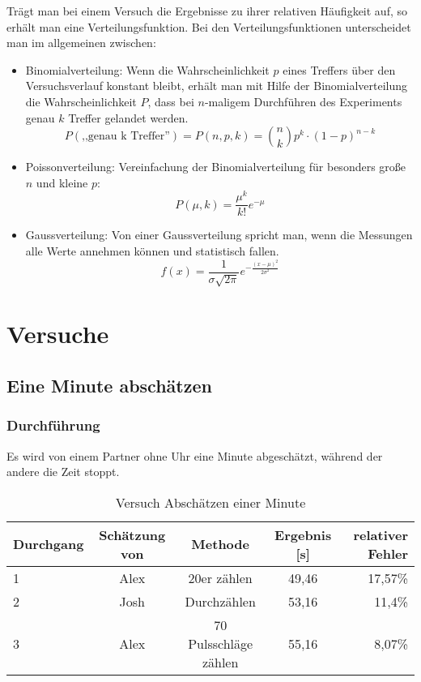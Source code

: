 Trägt man bei einem Versuch die Ergebnisse zu ihrer relativen Häufigkeit auf, so erhält man eine Verteilungsfunktion. Bei den Verteilungsfunktionen unterscheidet man im allgemeinen zwischen:
\begin{itemize}
  \item Binomialverteilung: Wenn die Wahrscheinlichkeit $p$ eines Treffers über den Versuchsverlauf konstant bleibt, erhält man mit Hilfe der Binomialverteilung die Wahrscheinlichkeit $P$, dass bei $n$-maligem Durchführen des Experiments genau $k$ Treffer gelandet werden.
\begin{equation}
  P(\text{,,genau k Treffer''})=P(n,p,k)=\binom{n}{k}p^k\cdot (1-p)^{n-k}
  \label{binomvert}
\end{equation}
  \item Poissonverteilung: Vereinfachung der Binomialverteilung für besonders große $n$ und kleine $p$:
    \begin{equation}
      P(\mu ,k)=\frac{\mu^k}{k!}e^{-\mu}
      \label{poisson}
    \end{equation}
  \item Gaussverteilung: Von einer Gaussverteilung spricht man, wenn die Messungen alle Werte annehmen können und statistisch fallen.
    \begin{equation}
      f(x)=\frac{1}{\sigma\sqrt{2\pi}}e^{-\frac{(x-\mu)^2}{2\sigma^2}}
      \label{gauss}
    \end{equation}
\end{itemize}
\section{Versuche}

\subsection{Eine Minute abschätzen}

\subsubsection{Durchführung}

Es wird von einem Partner ohne Uhr eine Minute abgeschätzt, während der andere die Zeit stoppt. 

\begin{table}[h]
  \centering
  \begin{tabular}{l | c | c | c | r}
    Durchgang & Schätzung von & Methode & Ergebnis [s] & relativer Fehler\\ \hline
    1 & Alex & 20er zählen & 49,46 & 17,57\% \\
    2 & Josh & Durchzählen & 53,16 & 11,4\% \\
    3 & Alex & 70 Pulsschläge zählen & 55,16 & 8,07\%
  \end{tabular}
  \caption{Versuch Abschätzen einer Minute}
  \label{tab:absch_minute}
\end{table}
